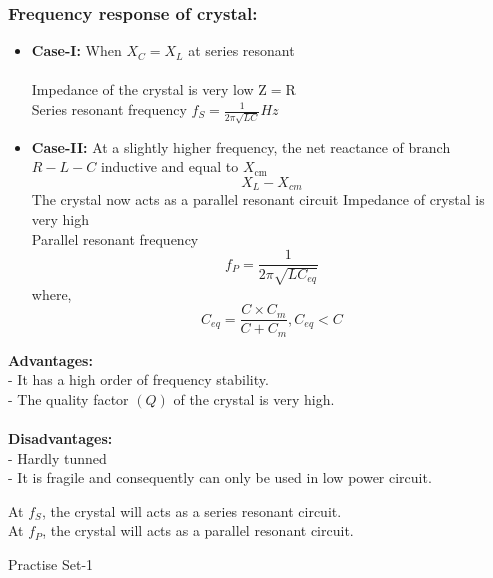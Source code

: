 \subsubsection{Frequency response of crystal:}
\begin{itemize}
	\item \textbf{Case-I:} When $X_{C}=X_{L}$ at series resonant\\\\
	Impedance of the crystal is very low $\mathrm{Z}=\mathrm{R}$\\
	Series resonant frequency $f_{S}=\frac{1}{2 \pi \sqrt{L C}} H z$\\
	\item \textbf{Case-II:} At a slightly higher frequency, the net reactance of branch $R-L-C$ inductive and equal to $X_{\mathrm{cm}}$
	$$
	X_{L}-X_{c m}
	$$
	The crystal now acts as a parallel resonant circuit Impedance of crystal is very high\\
	Parallel resonant frequency\\
	$$f_{P}=\frac{1}{2 \pi \sqrt{L C_{e q}}}$$ where, $$C_{e q}=\frac{C \times C_{m}}{C+C_{m}}, C_{e q}<C$$
\end{itemize}
\textbf{Advantages:}\\
- It has a high order of frequency stability.\\
- The quality factor $(Q)$ of the crystal is very high. \\\\
\textbf{Disadvantages:}\\
- Hardly tunned\\
- It is fragile and consequently can only be used in low power circuit.
\begin{note}
 At $f_{S}$, the crystal will acts as a series resonant circuit.\\
At $f_{P}$, the crystal will acts as a parallel resonant circuit. 
\end{note}
\newpage
\begin{abox}
	Practise Set-1
	\end{abox}


